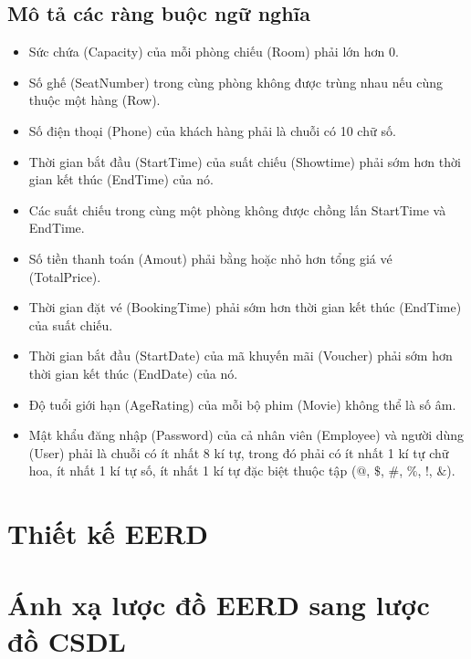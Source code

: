 \documentclass[a4paper]{article}
\begin{document}
\subsection{Mô tả các ràng buộc ngữ nghĩa}
\begin{itemize}
	\item Sức chứa (Capacity) của mỗi phòng chiếu (Room) phải lớn hơn 0.
	\item Số ghế (SeatNumber) trong cùng phòng không được trùng nhau nếu cùng thuộc một hàng (Row).
	\item Số điện thoại (Phone) của khách hàng phải là chuỗi có 10 chữ số.
	\item Thời gian bắt đầu (StartTime) của suất chiếu (Showtime) phải sớm hơn thời gian kết thúc (EndTime) của nó.
	\item Các suất chiếu trong cùng một phòng không được chồng lấn StartTime và EndTime.
	\item Số tiền thanh toán (Amout) phải bằng hoặc nhỏ hơn tổng giá vé (TotalPrice).
	\item Thời gian đặt vé (BookingTime) phải sớm hơn thời gian kết thúc (EndTime) của suất chiếu.
	\item Thời gian bắt đầu (StartDate) của mã khuyến mãi (Voucher) phải sớm hơn thời gian kết thúc (EndDate) của nó.
	\item Độ tuổi giới hạn (AgeRating) của mỗi bộ phim (Movie) không thể là số âm.
	\item Mật khẩu đăng nhập (Password) của cả nhân viên (Employee) và người dùng (User) phải là chuỗi có ít nhất 8 kí tự, trong đó phải có ít nhất 1 kí tự chữ hoa, ít nhất 1 kí tự số, ít nhất 1 kí tự đặc biệt thuộc tập ($@$, $\mathdollar$, $\#$, $\%$, !, $\&$).
\end{itemize}
\section{Thiết kế EERD}
\section{Ánh xạ lược đồ EERD sang lược đồ CSDL}
\end{document}
